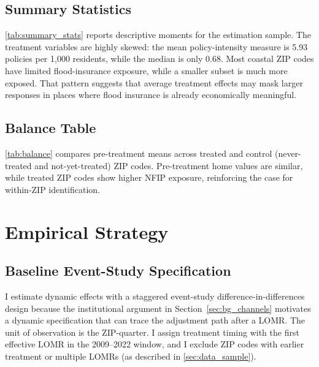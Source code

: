 \documentclass[12pt]{article}
\begin{document}


\subsection{Summary Statistics}\label{sec:data_sumstats}

\autoref{tab:summary_stats} reports descriptive moments for the estimation sample. The treatment variables are highly skewed: the mean policy-intensity measure is 5.93 policies per 1,000 residents, while the median is only 0.68. Most coastal ZIP codes have limited flood-insurance exposure, while a smaller subset is much more exposed. That pattern suggests that average treatment effects may mask larger responses in places where flood insurance is already economically meaningful.


\FloatBarrier

\subsection{Balance Table}\label{sec:data_balance}

\autoref{tab:balance} compares pre-treatment means across treated and control (never-treated and not-yet-treated) ZIP codes. Pre-treatment home values are similar, while treated ZIP codes show higher NFIP exposure, reinforcing the case for within-ZIP identification.



\section{Empirical Strategy}\label{sec:strategy}

\subsection{Baseline Event-Study Specification}\label{sec:strategy_baseline}

I estimate dynamic effects with a staggered event-study difference-in-differences design because the institutional argument in Section~\ref{sec:bg_channels} motivates a dynamic specification that can trace the adjustment path after a LOMR. The unit of observation is the ZIP-quarter. I assign treatment timing with the first effective LOMR in the 2009--2022 window, and I exclude ZIP codes with earlier treatment or multiple LOMRs (as described in \autoref{sec:data_sample}).
\end{document}
